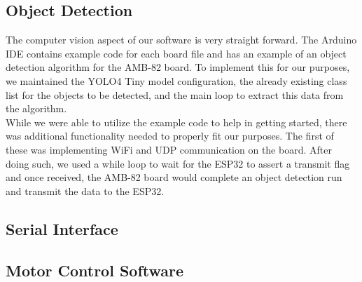 \subsection{Object Detection}
\noindent The computer vision aspect of our software is very straight forward. The Arduino IDE contains example code for each board file and has an example of an object detection algorithm for the AMB-82 board. To implement this for our purposes, we maintained the YOLO4 Tiny model configuration, the already existing class list for the objects to be detected, and the main loop to extract this data from the algorithm. \\

\noindent While we were able to utilize the example code to help in getting started, there was additional functionality needed to properly fit our purposes. The first of these was implementing WiFi and UDP communication on the board. After doing such, we used a while loop to wait for the ESP32 to assert a transmit flag and once received, the AMB-82 board would complete an object detection run and transmit the data to the ESP32. \\

\subsection{Serial Interface}

\subsection{Motor Control Software}


\\